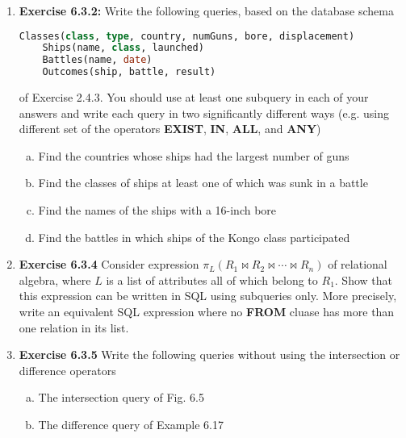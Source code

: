 \documentclass[12pt]{article}
\begin{document}
\begin{enumerate}[1.]
    \item \textbf{Exercise 6.3.2:} Write the following queries, based on the database
    schema

    \begin{lstlisting}[language=SQL]
    Classes(class, type, country, numGuns, bore, displacement)
    Ships(name, class, launched)
    Battles(name, date)
    Outcomes(ship, battle, result)
    \end{lstlisting}

    \bigskip

    of Exercise 2.4.3. You should use at least one subquery in each of your answers
    and write each query in two significantly different ways (e.g. using different
    set of the operators \textbf{EXIST}, \textbf{IN}, \textbf{ALL}, and \textbf{ANY})

    \bigskip

    \begin{enumerate}[a)]
        \item Find the countries whose ships had the largest number of guns
        \item Find the classes of ships at least one of which was sunk in a battle
        \item Find the names of the ships with a 16-inch bore
        \item Find the battles in which ships of the Kongo class participated
    \end{enumerate}

    \item \textbf{Exercise 6.3.4} Consider expression $\pi_L (R_1 \bowtie R_2 \bowtie
    \cdots \bowtie R_n)$ of relational algebra, where $L$ is a list of attributes all
    of which belong to $R_1$. Show that this expression can be written in SQL using
    subqueries only. More precisely, write an equivalent SQL expression where no
    \textbf{FROM} cluase has more than one relation in its list.


    \item \textbf{Exercise 6.3.5} Write the following queries without using the intersection
    or difference operators

    \bigskip

    \begin{enumerate}[a)]
        \item The intersection query of Fig. 6.5
        \item The difference query of Example 6.17
    \end{enumerate}


\end{enumerate}
\end{document}
